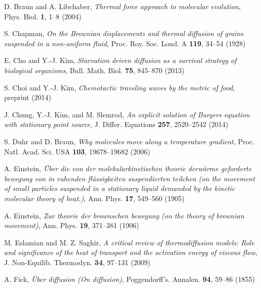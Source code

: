 \documentclass[11pt]{amsart}
\begin{document}
\providecommand{\bysame}{\leavevmode\hbox to3em{\hrulefill}\thinspace}
\providecommand{\MR}{\relax\ifhmode\unskip\space\fi MR }
\providecommand{\MRhref}[2]{%
  \href{http://www.ams.org/mathscinet-getitem?mr=#1}{#2}
}
\providecommand{\href}[2]{#2}
\begin{thebibliography}{10}

D. Braun and A. Libchaber, \emph{Thermal force approach to molecular
  evolution}, Phys. Biol. \textbf{1}, 1--8 (2004)

S. Chapman, \emph{On the {Brownian} displacements and thermal diffusion of
  grains suspended in a non-uniform fluid}, Proc. Roy. Soc. Lond. A
  \textbf{119}, 34--54 (1928)

E. Cho and Y.-J. Kim, \emph{Starvation driven diffusion as a survival
  strategy of biological organisms}, Bull. Math. Biol. \textbf{75},
  845--870 (2013)

S. Choi and Y.-J. Kim, \emph{Chemotactic traveling waves by the metric
  of food}, preprint (2014)

J. Chung, Y.-J. Kim, and M. Slemrod, \emph{An explicit solution
  of Burgers equation with stationary point source}, J. Differ.
  Equations \textbf{257}, 2520--2542 (2014)

S. Duhr and D. Braun, \emph{Why molecules move along a temperature
  gradient}, Proc. Natl. Acad. Sci. USA \textbf{103}, 19678--19682 (2006)

A. Einstein, \emph{\"{U}ber die von der molekularkinetischen theorie
  derw\"{a}rme geforderte bewegung von in ruhenden fl\"{u}ssigkeiten
  suspendierten teilchen (on the movement of small particles suspended in a
  stationary liquid demanded by the kinetic molecular theory of heat.)}, Ann.
  Phys. \textbf{17}, 549--560 (1905)

A. Einstein, \emph{\emph{Zur theorie der brownschen bewegung} (on the theory of
  brownian movement)}, Ann. Phys. \textbf{19}, 371--381 (1906)

M. Eslamian and M. Z. Saghir, \emph{A critical review of thermodiffusion
  models: Role and significance of the heat of transport and the activation
  energy of viscous flow}, J. Non-Equilib. Thermodyn. \textbf{34}, 97--131 (2009)

A. Fick, \emph{\"{U}ber diffusion ({O}n diffusion)}, Poggendorff's. Annalen.
  \textbf{94}, 59--86 (1855)


\end{thebibliography}
\end{document}
